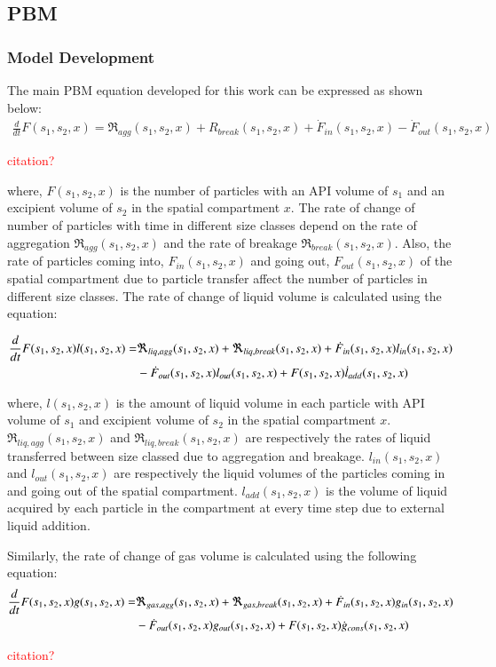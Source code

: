 \documentclass[preprint,11pt,authoryear]{elsarticle}
\begin{document}
	    
	  \subsection{PBM}
	    \subsubsection{Model Development}
	    \par The main PBM equation developed for this work can be expressed as shown below:
	    \begin{align}
	    \frac{d}{dt}F(s_1,s_2,x)=\Re_{agg}(s_1,s_2,x)+R_{break}(s_1,s_2,x)+\dot{F}_{in}(s_1,s_2,x)-\dot{F}_{out}(s_1,s_2,x)
	    \label{eqn:mthds_pbm_overall} 
	    \end{align}
	    \par \textcolor{red}{citation?}    
	    
	    \par where, $F(s_1,s_2,x)$ is the number of particles with an API volume of $s_1$ and an excipient volume of $s_2$ in the spatial compartment $x$. The rate of change of number of particles with time in different size classes depend on the rate of aggregation $\Re_{agg}(s_1,s_2,x)$ and the rate of breakage $\Re_{break}(s_1,s_2,x)$. Also, the rate of particles coming into, $F_{in}(s_1,s_2,x)$ and going out, $F_{out}(s_1,s_2,x)$ of the spatial compartment due to particle transfer affect the number of particles in different size classes. 
	The rate of change of liquid volume is calculated using the equation: 
	
	    \begin{align}
	    \frac{d}{dt}F(s_1,s_2,x)l(s_1,s_2,x)=& \Re_{liq,agg}(s_1,s_2,x)+\Re_{liq,break}(s_1,s_2,x)+\dot{F}_{in}(s_1,s_2,x)l_{in}(s_1,s_2,x)\notag\\
	    &-\dot{F}_{out}(s_1,s_2,x)l_{out}(s_1,s_2,x)+F(s_1,s_2,x)\dot{l}_{add}(s_1,s_2,x)
	    \end{align}
	    
	    \par where, $l(s_1,s_2,x)$ is the amount of liquid volume in each particle with API volume of $s_1$ and excipient volume of $s_2$ in the spatial compartment $x$. $\Re_{liq,agg}(s_1,s_2,x)$ and $\Re_{liq,break}(s_1,s_2,x)$ are respectively the rates of liquid transferred between size classed due to aggregation and breakage. $l_{in}(s_1,s_2,x)$ and $l_{out}(s_1,s_2,x)$ are respectively the liquid volumes of the particles coming in and going out of the spatial compartment. $l_{add}(s_1,s_2,x)$ is the volume of liquid acquired by each particle in the compartment at every time step due to external liquid addition. 
	    \par Similarly, the rate of change of gas volume is calculated using the following equation: 
	    \begin{align}
	    \frac{d}{dt}F(s_1,s_2,x)g(s_1,s_2,x)=& \Re_{gas,agg}(s_1,s_2,x)+\Re_{gas,break}(s_1,s_2,x)+\dot{F}_{in}(s_1,s_2,x)g_{in}(s_1,s_2,x)\notag\\
	    &-\dot{F}_{out}(s_1,s_2,x)g_{out}(s_1,s_2,x)+F(s_1,s_2,x)\dot{g}_{cons}(s_1,s_2,x)
	    \end{align}
	    \par \textcolor{red}{citation?}
	    
\end{document}
